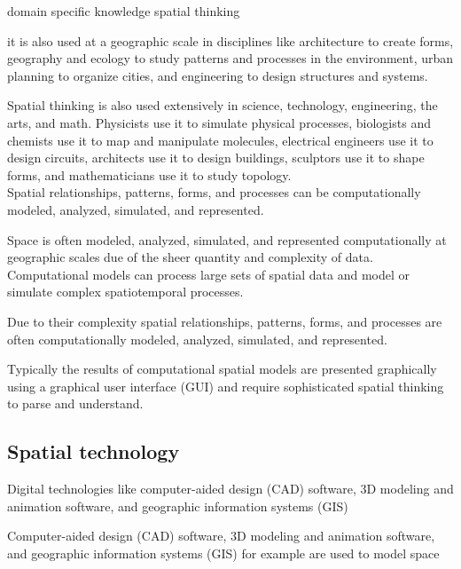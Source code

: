 domain specific knowledge
spatial thinking



it is also used at a geographic scale in disciplines like 
architecture to create forms, 
geography and ecology to study patterns and processes in the environment, 
urban planning to organize cities,
and 
engineering to design structures and systems. %


Spatial thinking is also used extensively in science, technology, engineering, the arts, and math. 
Physicists use it to simulate physical processes,
biologists and chemists use it to map and manipulate molecules,
electrical engineers use it to design circuits, 
architects use it to design buildings, 
sculptors use it to shape forms, 
and mathematicians use it to study topology. \\

Spatial relationships, patterns, forms, and processes can be computationally modeled, analyzed, simulated, and represented. 

Space is often modeled, analyzed, simulated, and represented computationally at geographic scales
due of the sheer quantity and complexity of data. 
Computational models can process large sets of spatial data and model or simulate complex spatiotemporal processes.


Due to their complexity spatial relationships, patterns, forms, and processes are often computationally modeled, analyzed, simulated, and represented. 

Typically the results of computational spatial models are presented graphically using a graphical user interface (GUI) and require sophisticated spatial thinking to parse and understand. 

%
\subsection{Spatial technology}

Digital technologies like computer-aided design (CAD) software, 3D modeling and animation software, and geographic information systems (GIS)

Computer-aided design (CAD) software, 3D modeling and animation software, and geographic information systems (GIS) for example are used to model space

